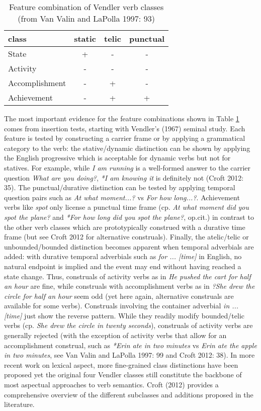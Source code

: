 \begin{table}

\begin{tabular}{lccc}
\hline\hline
\multicolumn{1}{l}{class}&\multicolumn{1}{c}{static}&\multicolumn{1}{c}{telic}&\multicolumn{1}{c}{punctual}\tabularnewline
\hline
State&+&-&-\tabularnewline
Activity&-&-&-\tabularnewline
Accomplishment&-&+&-\tabularnewline
Achievement&-&+&+\tabularnewline
\hline
\end{tabular}
\caption[Feature combination of Vendler verb classes]{Feature combination of Vendler verb classes (from Van Valin and LaPolla 1997: 93)}
\label{table:Vendler}
\end{table}

The most important evidence for the feature combinations shown in Table \ref{table:Vendler} comes from insertion tests, starting with Vendler's (1967) seminal study. Each feature is tested by constructing a carrier frame or by applying a grammatical category to the verb: the stative/dynamic distinction can be shown by applying the English progressive which is acceptable for dynamic verbs but not for statives. For example, while \textit{I am running} is a well-formed answer to the carrier question \textit{What are you doing?}, \textit{*I am knowing it} is definitely not (Croft 2012: 35). The punctual/durative distinction can be tested by applying temporal question pairs such as \textit{At what moment...?} vs \textit{For how long...?}. Achievement verbs like \textit{spot} only license a punctual time frame (cp. \textit{At what moment did you spot the plane?} and \textit{*For how long did you spot the plane?}, op.cit.) in contrast to the other verb classes which are prototypically construed with a durative time frame (but see Croft 2012 for alternative construals). Finally, the atelic/telic or unbounded/bounded distinction becomes apparent when temporal adverbials are added: with durative temporal adverbials such as \textit{for ... [time]} in English, no natural endpoint is implied and the event may end without having reached a state change. Thus, construals of activity verbs as in \textit{He pushed the cart for half an hour} are fine, while construals with accomplishment verbs as in \textit{?She drew the circle for half an hour} seem odd (yet here again, alternative construals are available for some verbs). Construals involving the container adverbial \textit{in ... [time]} just show the reverse pattern. While they readily modify bounded/telic verbs (cp. \textit{She drew the circle in twenty seconds}), construals of activity verbs are generally rejected (with the exception of activity verbs that allow for an accomplishment construal, such as \textit{*Erin ate in two minutes} vs \textit{Erin ate the apple in two minutes}, see Van Valin and LaPolla 1997: 99 and Croft 2012: 38). In more recent work on lexical aspect, more fine-grained class distinctions have been proposed yet the original four Vendler classes still constitute the backbone of most aspectual approaches to verb semantics. Croft (2012) provides a comprehensive overview of the different subclasses and additions proposed in the literature.

